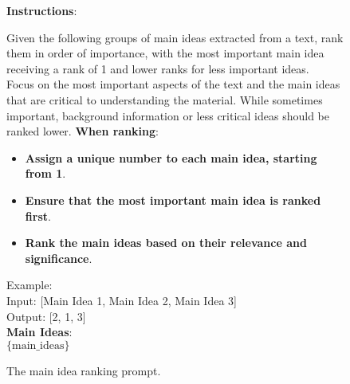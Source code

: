 \begin{figure}[h]
\centering
\begin{tcolorbox}[width=1\columnwidth, fontupper=\footnotesize,title=Ranking Main Ideas]
\RaggedRight
\obeylines
\textbf{Instructions}: \\
{Given the following groups of main ideas extracted from a text, rank them in order of importance, with the most important main idea receiving a rank of 1 and lower ranks for less important ideas. \\
Focus on the most important aspects of the text and the main ideas that are critical to understanding the material. While sometimes important, background information or less critical ideas should be ranked lower. \vspace{3mm}
\textbf{When ranking}:
\begin{itemize}[label=-,nosep]
    \item \textbf{Assign a unique number to each main idea, starting from 1}.
    \item \textbf{Ensure that the most important main idea is ranked first}.
    \item \textbf{Rank the main ideas based on their relevance and significance}.
\end{itemize}}
\vspace{3mm}
Example: \\
\tabto{1cm} Input: [Main Idea 1, Main Idea 2, Main Idea 3] \\
\tabto{1cm} Output: [2, 1, 3] \\
\vspace{3mm}
\vspace{3mm}
\textbf{Main Ideas}: \\
$\{\text{main\_ideas}\}$ \\
\end{tcolorbox}
\caption{The main idea ranking prompt.}
\label{fig:main_idea_ranking_prompt}
\end{figure}



